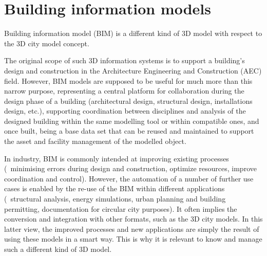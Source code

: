
\setchapterpreamble[u]{\margintoc}

\graphicspath{{bim/}}
\renewcommand*{\thelesson}{7.2}

\chapter{Building information models}%
\label{chap:bim}


Building information model (BIM) is a different kind of 3D model with respect to the 3D city model concept.



The original scope of such 3D information systems is to support a building's design and construction in the Architecture Engineering and Construction (AEC) field.
However, BIM models are supposed to be useful for much more than this narrow purpose, representing a central platform for collaboration during the design phase of a building (architectural design, structural design, installations design, etc.), supporting coordination between disciplines and analysis of the designed building within the same modelling tool or within compatible ones, and once built, being a base data set that can be reused and maintained to support the asset and facility management of the modelled object.

In industry, BIM is commonly intended at improving existing processes (\eg\ minimising errors during design and construction, optimize resources, improve coordination and control). %
However, the automation of a number of further use cases is enabled by the re-use of the BIM within different applications (\eg\ structural analysis, energy simulations, urban planning and building permitting, documentation for circular city purposes).
It often implies the conversion and integration with other formats, such as the 3D city models.
In this latter view, the improved processes and new applications are simply the result of using these models in a smart way.
This is why it is relevant to know and manage such a different kind of 3D model.




